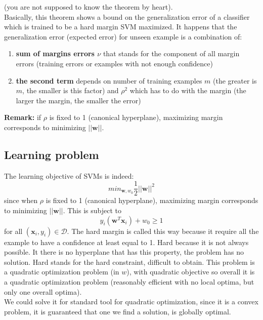     (you are not supposed to know the theorem by heart).\\
    Basically, this theorem shows a bound on the generalization error of a classifier which is trained to be a hard margin SVM maximized. It happens that the generalization error (expected error) for unseen example is a combination of:
    \begin{enumerate}
        \item \textbf{sum of margins errors $\nu$} that stands for the component of all margin errors (training errors or examples with not enough confidence)
        \item \textbf{the second term} depends on number of training examples $m$ (the greater is $m$, the smaller is this factor) and $\rho^2$ which has to do with the margin (the larger the margin, the smaller the error)
    \end{enumerate}
    
    \textbf{Remark:} if $\rho$ is fixed to 1 (canonical hyperplane), maximizing margin corresponds to minimizing $||\pmb{w}||$.

    \subsection{Learning problem}
        The learning objective of SVMs is indeed: 
        \begin{equation}
            min_{\pmb{w}, w_0} \frac{1}{2} ||\pmb{w}||^2
        \end{equation}
        since when $\rho$ is fixed to 1 (canonical hyperplane), maximizing margin corresponds to minimizing $||\pmb{w}||$.
        This is subject to 
        $$y_i (\pmb{w}^T \pmb{x}_i) + w_0 \geq 1$$ 
        for all $(\pmb{x}_i, y_i) \in \mathcal{D}$. The hard margin is called this way because it require all the example to have a confidence at least equal to 1. Hard because it is not always possible. 
        It there is no hyperplane that has this property, the problem has no solution. Hard stands for the hard constraint, difficult to obtain. 
        This problem is a quadratic optimization problem (in $w$), with quadratic objective so overall it is a quadratic optimization problem (reasonably efficient with no local optima, but only one overall optima).\\
        We could solve it for standard tool for quadratic optimization, since it is a convex problem, it is guaranteed that one we find a solution, is globally optimal. 
        
